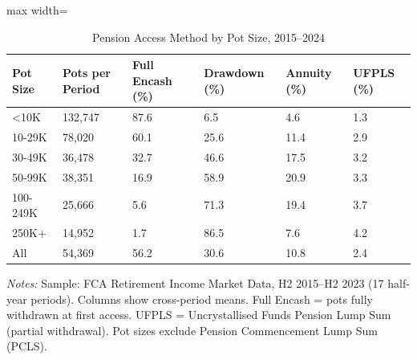 \begin{table}[!h]
\centering
\caption{\label{tab:tab:summary}Pension Access Method by Pot Size, 2015--2024}
\centering
\begin{adjustbox}{max width=\textwidth}
\begin{threeparttable}
\begin{tabular}[t]{llllll}
\toprule
Pot Size & Pots per Period & Full Encash (\%) & Drawdown (\%) & Annuity (\%) & UFPLS (\%)\\
\midrule
<10K & 132,747 & 87.6 & 6.5 & 4.6 & 1.3\\
10-29K & 78,020 & 60.1 & 25.6 & 11.4 & 2.9\\
30-49K & 36,478 & 32.7 & 46.6 & 17.5 & 3.2\\
50-99K & 38,351 & 16.9 & 58.9 & 20.9 & 3.3\\
100-249K & 25,666 & 5.6 & 71.3 & 19.4 & 3.7\\
\addlinespace
250K+ & 14,952 & 1.7 & 86.5 & 7.6 & 4.2\\
All & 54,369 & 56.2 & 30.6 & 10.8 & 2.4\\
\bottomrule
\end{tabular}
\begin{tablenotes}[flushleft]\footnotesize
\item[] \textit{Notes:} Sample: FCA Retirement Income Market Data, H2 2015--H2 2023 (17 half-year periods). Columns show cross-period means. Full Encash = pots fully withdrawn at first access. UFPLS = Uncrystallised Funds Pension Lump Sum (partial withdrawal). Pot sizes exclude Pension Commencement Lump Sum (PCLS).
\end{tablenotes}
\end{threeparttable}
\end{adjustbox}
\end{table}
